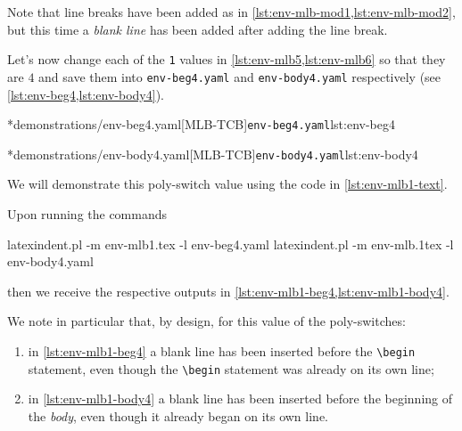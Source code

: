 	Note that line breaks have been added as in \cref{lst:env-mlb-mod1,lst:env-mlb-mod2}, but this time a
	\emph{blank line} has been added after adding the line break.

	Let's now change%
	 each of
	the \texttt{1} values in \cref{lst:env-mlb5,lst:env-mlb6} so that they are
	$4$ and save them into \texttt{env-beg4.yaml} and
	\texttt{env-body4.yaml} respectively (see \cref{lst:env-beg4,lst:env-body4}).

	\begin{minipage}{.45\textwidth}
		\cmhlistingsfromfile[style=yaml-LST]*{demonstrations/env-beg4.yaml}[MLB-TCB]{\texttt{env-beg4.yaml}}{lst:env-beg4}
	\end{minipage}
	\hfill
	\begin{minipage}{.45\textwidth}
		\cmhlistingsfromfile[style=yaml-LST]*{demonstrations/env-body4.yaml}[MLB-TCB]{\texttt{env-body4.yaml}}{lst:env-body4}
	\end{minipage}

	We will demonstrate this poly-switch value using the code in \cref{lst:env-mlb1-text}.


	Upon running the commands
	\begin{commandshell}
latexindent.pl -m env-mlb1.tex -l env-beg4.yaml
latexindent.pl -m env-mlb.1tex -l env-body4.yaml
\end{commandshell}

	then we receive the respective outputs in \cref{lst:env-mlb1-beg4,lst:env-mlb1-body4}.

	\begin{cmhtcbraster}[raster column skip=.1\linewidth]
	\end{cmhtcbraster}

	We note in particular that, by design, for this value of the poly-switches:
	\begin{enumerate}
		\item in \cref{lst:env-mlb1-beg4} a blank line has been inserted before the
		      \lstinline!\begin! statement, even though the \lstinline!\begin!
		      statement was already on its own line;
		\item in \cref{lst:env-mlb1-body4} a blank line has been inserted before the beginning of the
		      \emph{body}, even though it already began on its own line.
	\end{enumerate}


